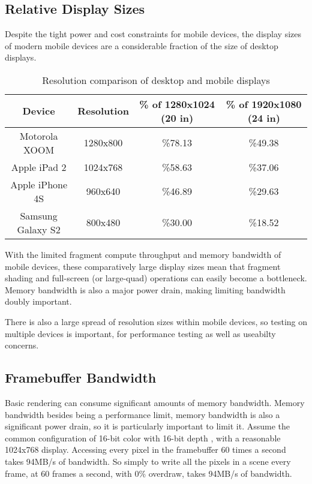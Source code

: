 \subsection{Relative Display Sizes}\label{Jon-McCaffrey:relative-display-sizes}

 

Despite the tight power and cost constraints for mobile devices, the display
sizes of modern mobile devices are a considerable fraction of the size of
desktop displays.  

\begin{table}[htb]\centering \begin{tabular}{|c|c|c|c|} 
\hline \small{Device} & \small{Resolution} & \small{\% of 1280x1024 (20 in)} & \small{\% of 1920x1080 (24 in)}  \\ \hline 
\small{Motorola XOOM} & \small{1280x800} & \small{\%78.13} & \small{\%49.38}\\ 
\hline \small{Apple iPad 2} & \small{1024x768} & \small{\%58.63} & \small{\%37.06}\\ 
\hline \small{Apple iPhone 4S} & \small{960x640} & \small{\%46.89} & \small{\%29.63}\\
\hline \small{Samsung Galaxy S2} & \small{800x480} & \small{\%30.00} & \small{\%18.52}\\ \hline
\end{tabular} 
\caption{Resolution comparison of desktop and mobile displays} 
\label{JonMcCaffrey:resolutions} \end{table}


With the limited fragment compute throughput and memory bandwidth of mobile
devices, these comparatively large display sizes mean that fragment shading and
full-screen (or large-quad) operations can easily become a bottleneck.  Memory
bandwidth is also a major power drain, making limiting bandwidth doubly
important.

There is also a large spread of resolution sizes within mobile devices, so
testing on multiple devices is important, for performance testing as well as
useabilty concerns.

\subsection{Framebuffer Bandwidth}\label{Jon-McCaffrey-Framebuffer-Bandwidth}

Basic rendering can consume significant amounts of memory bandwidth.  Memory
bandwidth besides being a performance limit, memory bandwidth is also a
significant power drain, so it is particularly important to limit it.  Assume
the common configuration of 16-bit color with 16-bit depth
\cite{Google11}, with a reasonable 1024x768 display.  Accessing every
pixel in the framebuffer 60 times a second takes 94MB/s of bandwidth.  So
simply to write all the pixels in a scene every frame, at 60 frames a second,
with 0\% overdraw, takes 94MB/s of bandwidth.

